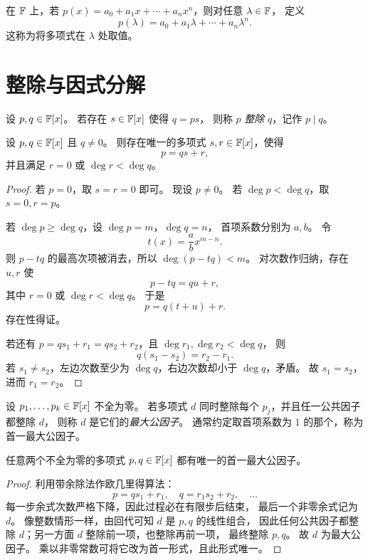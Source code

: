 \begin{example}
在 $\mathbb{F}$ 上，若 $p(x)=a_0+a_1x+\cdots+a_nx^n$，则对任意 $\lambda\in\mathbb{F}$，
定义
\[
p(\lambda)=a_0+a_1\lambda+\cdots+a_n\lambda^n.
\]
这称为将多项式在 $\lambda$ 处取值。
\end{example}

\section{整除与因式分解}

\begin{definition}
设 $p,q\in\mathbb{F}[x]$。
若存在 $s\in\mathbb{F}[x]$ 使得 $q=ps$，
则称 $p$ \emph{整除} $q$，记作 $p\mid q$。
\end{definition}

\begin{theorem}[带余除法]
设 $p,q\in\mathbb{F}[x]$ 且 $q\neq 0$。
则存在唯一的多项式 $s,r\in\mathbb{F}[x]$，使得
\[
p=qs+r,
\]
并且满足 $r=0$ 或 $\deg r<\deg q$。
\end{theorem}

\begin{proof}
若 $p=0$，取 $s=r=0$ 即可。
现设 $p\neq 0$。
若 $\deg p<\deg q$，取 $s=0,r=p$。

若 $\deg p\ge \deg q$，设 $\deg p=m$，$\deg q=n$，
首项系数分别为 $a,b$。
令
\[
t(x)=\frac{a}{b}x^{m-n}.
\]
则 $p-tq$ 的最高次项被消去，所以 $\deg(p-tq)<m$。
对次数作归纳，存在 $u,r$ 使
\[
p-tq=qu+r,
\]
其中 $r=0$ 或 $\deg r<\deg q$。
于是
\[
p=q(t+u)+r.
\]
存在性得证。

若还有 $p=qs_1+r_1=qs_2+r_2$，且 $\deg r_1,\deg r_2<\deg q$，
则
\[
q(s_1-s_2)=r_2-r_1.
\]
若 $s_1\neq s_2$，左边次数至少为 $\deg q$，右边次数却小于 $\deg q$，矛盾。
故 $s_1=s_2$，进而 $r_1=r_2$。
\end{proof}

\begin{definition}
设 $p_1,\dots,p_k\in\mathbb{F}[x]$ 不全为零。
若多项式 $d$ 同时整除每个 $p_j$，并且任一公共因子都整除 $d$，
则称 $d$ 是它们的\emph{最大公因子}。
通常约定取首项系数为 $1$ 的那个，称为首一最大公因子。
\end{definition}

\begin{proposition}
任意两个不全为零的多项式 $p,q\in\mathbb{F}[x]$ 都有唯一的首一最大公因子。
\end{proposition}

\begin{proof}
利用带余除法作欧几里得算法：
\[
p=q s_1+r_1,\quad q=r_1s_2+r_2,\quad \dots
\]
每一步余式次数严格下降，因此过程必在有限步后结束，
最后一个非零余式记为 $d$。
像整数情形一样，由回代可知 $d$ 是 $p,q$ 的线性组合，
因此任何公共因子都整除 $d$；另一方面 $d$ 整除前一项，也整除再前一项，
最终整除 $p,q$。
故 $d$ 为最大公因子。
乘以非零常数可将它改为首一形式，且此形式唯一。
\end{proof}


